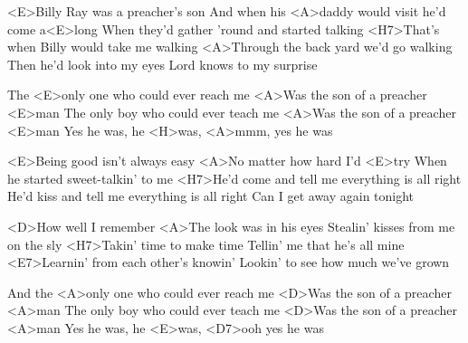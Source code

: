 
\zs
<E>Billy Ray was a preacher's son
And when his <A>daddy would visit he'd come a<E>long
When they'd gather 'round and started talking
<H7>That's when Billy would take me walking
<A>Through the back yard we'd go walking
Then he'd look into my eyes
Lord knows to my surprise
\ks

\zr
The <E>only one who could ever reach me
<A>Was the son of a preacher <E>man
The only boy who could ever teach me
<A>Was the son of a preacher <E>man
Yes he was, he <H>was, <A>mmm, yes he was
\kr

\zs
<E>Being good isn't always easy
<A>No matter how hard I'd <E>try
When he started sweet-talkin' to me
<H7>He'd come and tell me everything is all right
He'd kiss and tell me everything is all right
Can I get away again tonight
\ks

\zr\kr

\zs
<D>How well I remember
<A>The look was in his eyes
Stealin' kisses from me on the sly
<H7>Takin' time to make time
Tellin' me that he's all mine
<E7>Learnin' from each other's knowin'
Lookin' to see how much we've grown
\ks

\zr
And the <A>only one who could ever reach me
<D>Was the son of a preacher <A>man
The only boy who could ever teach me
<D>Was the son of a preacher <A>man
Yes he was, he <E>was, <D7>ooh yes he was
\kr

\kp
